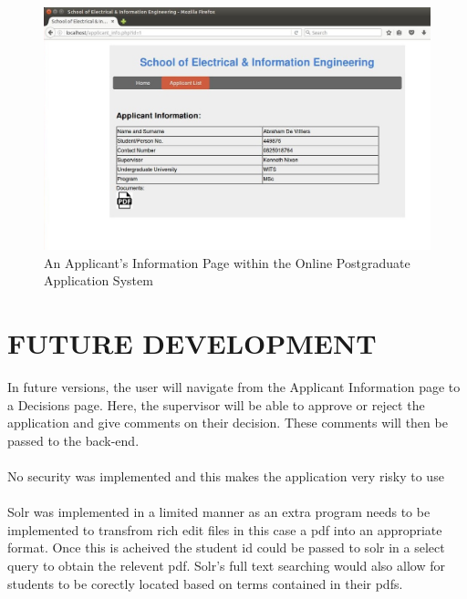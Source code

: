 \documentclass[journal,comsoc,onecolumn]{IEEEtran}
\begin{document}
\begin{figure}[h]
	\centering
	\includegraphics[width=0.7\linewidth]{information}
	\caption{An Applicant's Information Page within the Online Postgraduate Application System}
	\label{fig:information}
\end{figure}


\section{FUTURE DEVELOPMENT}
In future versions, the user will navigate from the Applicant Information page to a Decisions page. Here, the supervisor will be able to approve or reject the application and give comments on their decision. These comments will then be passed to the back-end. \\\\
No security was implemented and this makes the application very risky to use\\\\
Solr was implemented in a limited manner as an extra program needs to be implemented to transfrom rich edit files in this case a pdf into an appropriate format. Once this is acheived the student id could be passed to solr in a select query to obtain the relevent pdf. Solr's full text searching would also allow for students to be corectly located based on terms contained in their pdfs.\\\\

 
	
	
\end{document}
